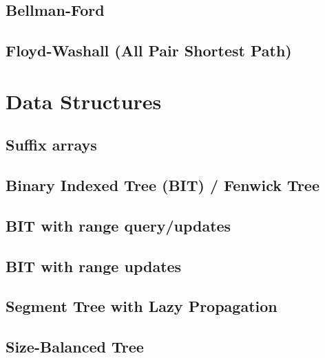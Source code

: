 \documentclass[9pt]{extarticle}
\begin{document}
\begin{multicols*}{3}
\subsection{Bellman-Ford}


\subsection{Floyd-Washall (All Pair Shortest Path)}


\section{Data Structures}

\subsection{Suffix arrays} %


\subsection{Binary Indexed Tree (BIT) / Fenwick Tree} %


\subsection{BIT with range query/updates}


\subsection{BIT with range updates} %


\subsection{Segment Tree with Lazy Propagation} %


\subsection{Size-Balanced Tree}



\end{multicols*}
\end{document}
